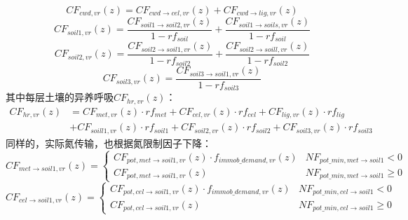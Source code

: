 \begin{equation}
C F_{c w d, vr}(z)=C F_{c w d \rightarrow cel, vr}(z)+C F_{c w d \rightarrow lig, vr}(z)
\end{equation}
\begin{equation}
C F_{{soil } 1, vr}(z)=\frac{C F_{{soil1 } \rightarrow { soil } 2, vr}(z)}{1-r f_{{soil }}}+\frac{C F_{{soil } 1 \rightarrow { soils,vr }}(z)}{1-r f_{{soil }}}
\end{equation}
\begin{equation}
C F_{{soil2,vr }}(z)=\frac{C F_{{soil2 } \rightarrow { soil1,vr }}(z)}{1-r f_{{soil2 }}}+\frac{C F_{{soil2 } \rightarrow { soill,vr }}(z)}{1-r f_{{soil2 }}}
\end{equation}
\begin{equation}
C F_{{soil3,vr }}(z)=\frac{C F_{{soil } 3 \rightarrow { soil1,vr}}(z)}{1-r f_{{soil3 }}}
\end{equation}
其中每层土壤的异养呼吸$CF_{hr,vr}\left(z\right)$：
\begin{equation}
\begin{aligned}
C F_{h r, vr}(z)&=C F_{met, vr}(z) \cdot r f_{met}+C F_{cel, vr}(z) \cdot r f_{cel}+C F_{lig, vr}(z) \cdot r f_{lig} \\ 
&+C F_{{soill } 1, vr}(z) \cdot r f_{{soil1 }}+C F_{{soil2,vr }}(z) \cdot r f_{{soil2 }}+C F_{{soil3,vr }}(z) \cdot r f_{{soil3 }}
\end{aligned}
\end{equation}
同样的，实际氮传输，也根据氮限制因子下降：
\begin{equation}
    CF_{met \rightarrow soil1, vr}(z)=\left\{\begin{array}{ll} CF_{pot, met \rightarrow soil1, vr}(z) \cdot f_{immob\_demand, vr}(z) & NF_{pot\_{min, met \rightarrow soil1}} <0 \\ 
    CF_{pot, met \rightarrow soil1, vr}(z) & NF_{pot\_{min, met \rightarrow soil1}} \geqslant 0
   \end{array}\right.
\end{equation}
\begin{equation}
    CF_{cel \rightarrow soil1, vr}(z)=\left\{\begin{array}{ll} CF_{pot, cel \rightarrow soil1, vr}(z) \cdot f_{immob\_demand, vr}(z) & NF_{pot\_{min, cel \rightarrow soil1}} <0 \\ 
    CF_{pot, cel \rightarrow soil1, vr}(z) & NF_{pot\_{min, cel \rightarrow soil1}} \geqslant 0
   \end{array}\right.
\end{equation}
